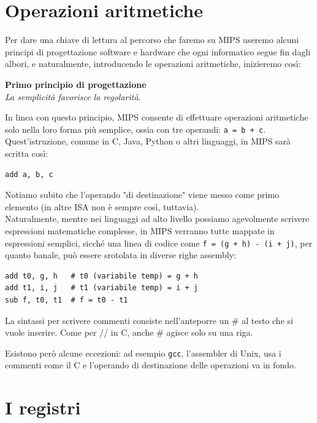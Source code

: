 \documentclass[class=book, crop=false, oneside]{standalone}
\begin{document}
\section{Operazioni aritmetiche}
Per dare una chiave di lettura al percorso che faremo su MIPS useremo alcuni principi di progettazione software e hardware che ogni informatico segue fin dagli albori, e naturalmente, introducendo le operazioni aritmetiche, inizieremo così:

\vspace{8pt}
\begin{tcolorbox}
\centering
\textbf{Primo principio di progettazione}\\
\emph{La semplicità favorisce la regolarità}.
\end{tcolorbox}
\vspace{5pt}

In linea con questo principio, MIPS consente di effettuare operazioni aritmetiche solo nella loro forma più semplice, ossia con tre operandi: \texttt{a = b + c}.
Quest'istruzione, comune in C, Java, Python o altri linguaggi, in MIPS sarà scritta così:
\begin{verbatim}
add a, b, c
\end{verbatim}

Notiamo subito che l'operando "di destinazione" viene messo come primo elemento (in altre ISA non è sempre così, tuttavia).\\
Naturalmente, mentre nei linguaggi ad alto livello possiamo agevolmente scrivere espressioni matematiche complesse, in MIPS verranno tutte mappate in espressioni semplici, sicché una linea di codice come \texttt{f = (g + h) - (i + j)}, per quanto banale, può essere srotolata in diverse righe assembly:

\begin{verbatim}
add t0, g, h   # t0 (variabile temp) = g + h
add t1, i, j   # t1 (variabile temp) = i + j
sub f, t0, t1  # f = t0 - t1
\end{verbatim}

La sintassi per scrivere commenti consiste nell'anteporre un \# al testo che si vuole inserire. Come per // in C, anche \# agisce solo su una riga.

Esistono però alcune eccezioni: ad esempio \texttt{gcc}, l'assembler di Unix, usa i commenti come il C e l'operando di destinazione delle operazioni va in fondo.

\section{I registri}
\end{document}
